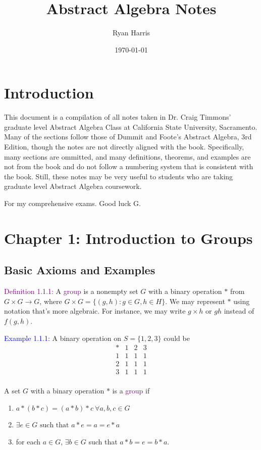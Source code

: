 \documentclass{article}
\title{Abstract Algebra Notes}
\author{Ryan Harris}
\date{\today}
\begin{document}
\maketitle

\setcounter{section}{-1}
\section{Introduction}
This document is a compilation of all notes taken in Dr. Craig Timmons' graduate level Abstract Algebra Class at California State 
University, Sacramento. Many of the sections follow those of Dummit and Foote's Abstract Algebra, 3rd Edition, though the notes are 
not directly aligned with the book. Specifically, many sections are ommitted, and many definitions, theorems, and examples are not from 
the book and do not follow a numbering system that is consistent with the book. Still, these notes may be very useful to students who are 
taking graduate level Abstract Algebra coursework.

For my comprehensive exams. Good luck G.

\section{Chapter 1: Introduction to Groups}
\subsection{Basic Axioms and Examples}

\textcolor{purple}{Definition 1.1.1:} A \textcolor{purple}{group} is a nonempty set $G$ with a binary operation $*$ from 
$G \times G \longrightarrow G$, where $G \times G = \{(g,h): g \in G, h \in H\}$. We may represent $*$ using notation that's more 
algebraic. For instance, we may write $g \times h$ or $gh$ instead of $f(g,h)$.

\textcolor{blue}{Example 1.1.1:} A binary operation on $S = \{1,2,3\}$ could be 
\[
\begin{array}{c|ccc}
    * & 1 & 2 & 3 \\ \hline
    1 & 1 & 1 & 1 \\
    2 & 1 & 1 & 1 \\
    3 & 1 & 1 & 1 \\
\end{array}
\]

A set $G$ with a binary operation $*$ is a \textcolor{purple}{group} if
\begin{enumerate}
    \item $a * (b * c) = (a * b) * c \ \forall a,b,c \in G$
    \item $\exists e \in G \text{ such that } a * e = a = e * a$
    \item for each $ a \in G$, $\exists b \in G$ such that $a * b = e = b * a$.
\end{enumerate}
\end{document}
